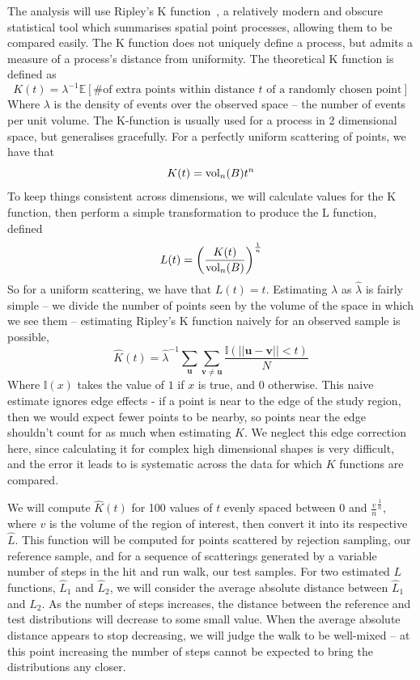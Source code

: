 The analysis will use Ripley's K function~\cite{Dixon06}, a relatively modern and obscure statistical tool which summarises spatial point processes, allowing them to be compared easily. The K function does not uniquely define a process, but admits a measure of a process's distance from uniformity. The theoretical K function is defined as
$$
K(t) = \lambda^{-1}\mathbb{E}[\mbox{\# of extra points within distance $t$ of a randomly chosen point}]
$$
Where $\lambda$ is the density of events over the observed space -- the number of events per unit volume. The K-function is usually used for a process in 2 dimensional space, but generalises gracefully. For a perfectly uniform scattering of points, we have that
$$
K(t) = \mbox{vol}_n(B)t^n
$$
To keep things consistent across dimensions, we will calculate values for the K function, then perform a simple transformation to produce the L function, defined
$$
L(t) = \left(\frac{K(t)}{\mbox{vol}_n(B)}\right)^{\frac{1}{n}}
$$
So for a uniform scattering, we have that $L(t) = t$. Estimating $\lambda$ as $\widehat{\lambda}$ is fairly simple -- we divide the number of points seen by the volume of the space in which we see them -- estimating Ripley's K function naively for an observed sample is possible,
$$
\widehat{K}(t) =  \widehat{\lambda}^{-1} \sum_{\bm{u}} \sum_{\bm{v} \neq \bm{u}} \frac{\mathbb{I}(||\bm{u}-\bm{v}|| < t)}{N}
$$
Where $\mathbb{I}(x)$ takes the value of $1$ if $x$ is true, and $0$ otherwise. This naive estimate ignores edge effects - if a point is near to the edge of the study region, then we would expect fewer points to be nearby, so points near the edge shouldn't count for as much when estimating $K$. We neglect this edge correction here, since calculating it for complex high dimensional shapes is very difficult, and the error it leads to is systematic across the data for which $K$ functions are compared.

We will compute $\widehat{K}(t)$ for 100 values of $t$ evenly spaced between 0 and $\frac{v}{n}^{\frac{1}{n}}$, where $v$ is the volume of the region of interest, then convert it into its respective $\widehat{L}$. This function will be computed for points scattered by rejection sampling, our reference sample, and for a sequence of scatterings generated by a variable number of steps in the hit and run walk, our test samples. For two estimated $L$ functions, $\widehat{L}_1$ and $\widehat{L}_2$, we will consider the average absolute distance between $\widehat{L}_1$ and $\widehat{L}_2$. As the number of steps increases, the distance between the reference and test distributions will decrease to some small value. When the average absolute distance appears to stop decreasing, we will judge the walk to be well-mixed -- at this point increasing the number of steps cannot be expected to bring the distributions any closer.

